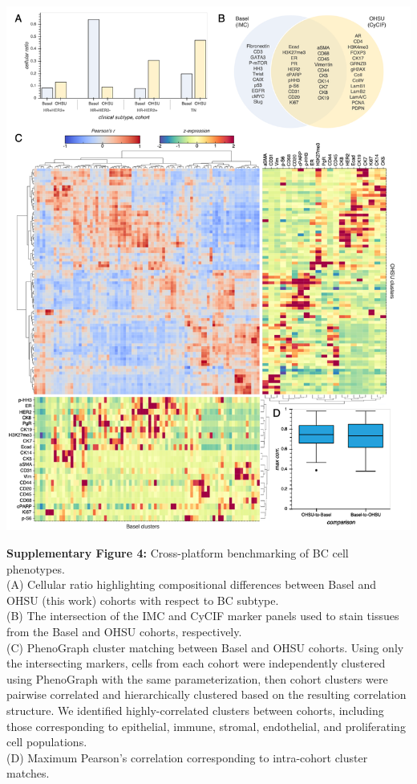 \documentclass[preprint,review,3p,12pt]{elsarticle}
\begin{document}
\begin{suppfigure}[p]
\centering\includegraphics[width=\linewidth,
                 keepaspectratio]{suppfig4_secondrevision}
\caption{}
\label{fig:suppfig4}
\end{suppfigure}

\newpage

\noindent
\textbf{Supplementary Figure 4:} Cross-platform benchmarking of BC cell phenotypes.\\
(A) Cellular ratio highlighting compositional differences between Basel \cite{jackson_single-cell_2020} and OHSU (this work) cohorts with respect to BC subtype.\\
(B) The intersection of the IMC and CyCIF marker panels used to stain tissues from the Basel and OHSU cohorts, respectively.\\
(C) PhenoGraph cluster matching between Basel and OHSU cohorts. Using only the intersecting markers, cells from each cohort were independently clustered using PhenoGraph with the same parameterization, then cohort clusters were pairwise correlated and hierarchically clustered based on the resulting correlation structure. We identified highly-correlated clusters between cohorts, including those corresponding to epithelial, immune, stromal, endothelial, and proliferating cell populations.\\
(D) Maximum Pearson's correlation corresponding to intra-cohort cluster matches.
\end{document}
